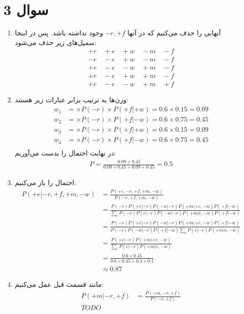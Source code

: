 \section*{سوال 3}
\begin{enumerate}
    \item آنهایی را حذف می‌کنیم که در آنها
    $-r, +f$
    وجود نداشته باشد. پس در اینجا سمپل‌های زیر حذف می‌شود:
    \begin{gather*}
        +r \quad +e \quad +w \quad -m \quad -f\\
        -r \quad -e \quad +w \quad -m \quad -f\\
        +r \quad -e \quad -w \quad +m \quad -f\\
        +r \quad -e \quad +w \quad +m \quad -f\\
        +r \quad -e \quad -w \quad +m \quad +f
    \end{gather*}
    \item وزن‌ها به ترتیب برابر عبارات زیر هستند:
    \begin{align*} %
        w_1 &= \times P(-r) \times P(+f | +w) = 0.6 \times 0.15 = 0.09\\
        w_2 &= \times P(-r) \times P(+f | -w) = 0.6 \times 0.75 = 0.45\\
        w_3 &= \times P(-r) \times P(+f | +w) = 0.6 \times 0.15 = 0.09\\
        w_4 &= \times P(-r) \times P(+f | -w) = 0.6 \times 0.75 = 0.45\\
    \end{align*}
    در نهایت احتمال‌ را بدست می‌آوریم:
    \begin{gather*}
        P = \frac{0.09 + 0.45}{0.09 + 0.45 + 0.09 + 0.45} = 0.5
    \end{gather*}
    \item احتمال را باز می‌کنیم:
    \begin{align*}
        P(+e | -r, +f, +m, -w) &= \frac{P(+e, -r, +f, +m, -w)}{P(-r, +f, +m, -w)}\\
        &= \frac{P(-r) P(+e | -r) P(-w | -r) P(+m | +e, -w) P(+f | -w)}{\sum_{e} P(-r) P(e | -r) P(-w | -r) P(+m | e, -w) P(+f | -w)}\\
        &= \frac{P(-r) P(+e | -r) P(-w | -r) P(+m | +e, -w) P(+f | -w)}{P(-r) P(-w | -r) P(+f | -w) \sum_{e} P(e | -r) P(+m | e, -w)}\\
        &= \frac{P(+e | -r) P(+m | +e, -w)}{\sum_{e} P(e | -r) P(+m | e, -w)}\\
        &= \frac{0.6 \times 0.45}{0.6 \times 0.45 + 0.4 \times 0.1}\\
        &\approx 0.87
    \end{align*}
    \item مانند قسمت قبل عمل می‌کنیم:
    \begin{align*}
        P(+m | -r, +f) &= \frac{P(+m, -r, +f)}{P(-r, +f)}\\
        TODO
    \end{align*}
\end{enumerate}